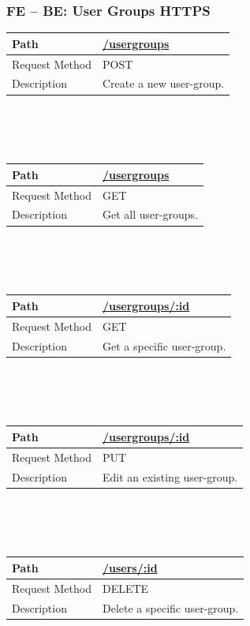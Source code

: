 \documentclass{scrreprt}
\begin{document}
\subsubsection{FE -- BE: User Groups HTTPS}
\begin{tabularx}{12cm}{l|l}
	Path & \url{/usergroups} \\\hline
	Request Method & POST \\\hline
	Description & Create a new user-group.
\end{tabularx}
\\
\\ \\
\begin{tabularx}{12cm}{l|l}
	Path & \url{/usergroups} \\\hline
	Request Method & GET \\\hline
	Description & Get all user-groups.
\end{tabularx}
\\
\\ \\
\begin{tabularx}{12cm}{l|l}
	Path & \url{/usergroups/:id} \\\hline
	Request Method & GET \\\hline
	Description & Get a specific user-group.
\end{tabularx}
\\
\\ \\
\begin{tabularx}{12cm}{l|l}
	Path & \url{/usergroups/:id} \\\hline
	Request Method & PUT  \\\hline
	Description & Edit an existing user-group.
\end{tabularx}
\\
\\ \\
\begin{tabularx}{12cm}{l|l}
	Path & \url{/users/:id} \\\hline
	Request Method & DELETE \\\hline
	Description & Delete a specific user-group.
\end{tabularx}
\\
\\ \\
\end{document}
